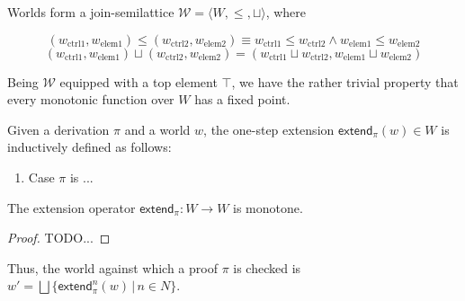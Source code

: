 \begin{definition}
  Worlds form a join-semilattice
  $\mathcal{W} = \langle W, \leq, \sqcup \rangle$, where

  \[
    (w_{\text{ctrl}1}, w_{\text{elem}1}) \leq
    (w_{\text{ctrl}2}, w_{\text{elem}2}) \equiv
    w_{\text{ctrl}1} \leq w_{\text{ctrl}2} \wedge
    w_{\text{elem}1} \leq w_{\text{elem}2}
  \]
  \[
    (w_{\text{ctrl}1}, w_{\text{elem}1}) \sqcup
    (w_{\text{ctrl}2}, w_{\text{elem}2}) =
    (w_{\text{ctrl}1} \sqcup w_{\text{ctrl}2}, w_{\text{elem}1} \sqcup w_{\text{elem}2})
  \]
\end{definition}

Being $\mathcal{W}$ equipped with a top element $\top$, we have the rather
trivial property that every monotonic function over $W$ has a fixed point.

Given a derivation $\pi$ and a world $w$, the one-step extension
$\textsf{extend}_{\pi}(w) \in W$ is inductively defined as follows:

\begin{enumerate}
\item Case $\pi$ is ...
\end{enumerate}

\begin{proposition}
  The extension operator $\textsf{extend}_{\pi} : W \rightarrow W$ is monotone.
\end{proposition}
\begin{proof}
  TODO...
\end{proof}

Thus, the world against which a proof $\pi$ is checked is
$w' = \bigsqcup \{ \textsf{extend}_{\pi}^n(w) \, | \, n \in N \}$.


